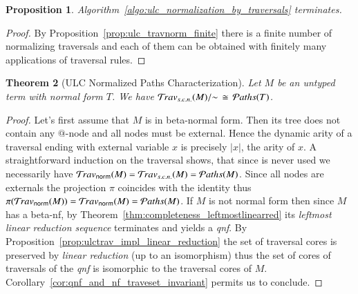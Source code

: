 \documentclass{elsarticle}
\theoremstyle{plain}
\newtheorem{theorem}{Theorem}[section]
\newtheorem{proposition}[theorem]{Proposition}
\theoremstyle{definition}
\newcommand{\normalizing}{{\sf norm}}
\newcommand{\travsetnorm}{\travset_\normalizing} %
\newcommand{\travsetscn}{\travset_{s.c.n.}} %
\def\structisomorphic{\cong} %
\def\coresymbol{\pi} %
\newcommand{\core}[1]{\coresymbol(#1)} %
\newcommand\pathset{{\mathcal{P}aths}} %
\begin{document}
\begin{proposition}
Algorithm~\ref{algo:ulc_normalization_by_traversals} terminates.
\end{proposition}
\begin{proof}
By Proposition~\ref{prop:ulc_travnorm_finite} there is a finite number of normalizing traversals and each of them can be obtained with finitely many applications of traversal rules.
\end{proof}

\begin{theorem}[ULC Normalized Paths Characterization]
\label{thm:path_charact_ulc}
Let $M$ be an untyped term with normal form $T$. We have
$\travsetscn(M)/{\sim} \, \structisomorphic\, \pathset(T)$.
\end{theorem}
\begin{proof}
Let's first assume that $M$ is in beta-normal form. Then its tree does not contain any $@$-node and all nodes must be external.
Hence the dynamic arity of a traversal ending with external variable $x$ is precisely $|x|$, the arity of $x$. A straightforward induction on the traversal
shows, that since  is never used we necessarily have
$\travsetnorm(M) = \travsetscn(M) = \pathset(M)$. Since all nodes are externals the projection $\coresymbol$ coincides with the identity thus $\core{\travsetnorm(M)} = \travsetnorm(M) = \pathset(M)$.
%
If $M$ is not normal form then since $M$ has a beta-nf, by Theorem~\ref{thm:completeness_leftmostlinearred} its \emph{leftmost linear reduction sequence} terminates and yields a \emph{qnf}. By Proposition~\ref{prop:ulctrav_impl_linear_reduction} the set of traversal cores is preserved by \emph{linear reduction} (up to an isomorphism) thus the set of cores of  traversals of the \emph{qnf} is isomorphic to the traversal cores of $M$. Corollary~\ref{cor:qnf_and_nf_traveset_invariant} permits us to conclude.
\end{proof}
\end{document}
